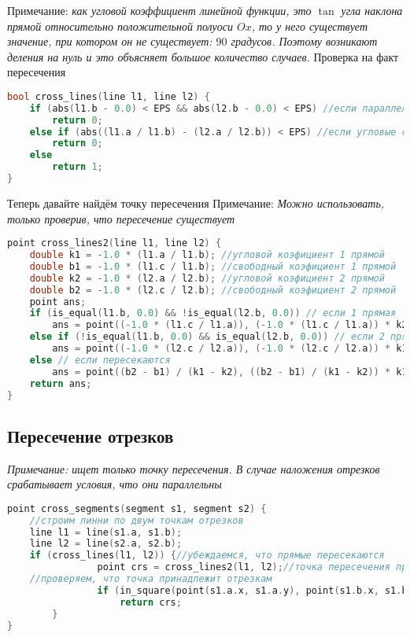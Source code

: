 Примечание: \textit{ как угловой коэффициент линейной функции, это $\tan$ угла наклона прямой относительно положительной полуоси $Ox$, то у него существует значение, при котором он не существует: $90$ градусов. Поэтому возникают деления на нуль и это объясняет большое количество случаев.}
\newline Проверка на факт пересечения
\begin{lstlisting}[language=C++]
bool cross_lines(line l1, line l2) {
    if (abs(l1.b - 0.0) < EPS && abs(l2.b - 0.0) < EPS) //если параллельны oY
        return 0;
    else if (abs((l1.a / l1.b) - (l2.a / l2.b)) < EPS) //если угловые совпали
        return 0;
    else
        return 1;
}
\end{lstlisting}
Теперь давайте найдём точку пересечения\newline
Примечание: \textit{Можно использовать, только проверив, что пересечение существует}\newline
\begin{lstlisting}[language=C++]
point cross_lines2(line l1, line l2) {
    double k1 = -1.0 * (l1.a / l1.b); //угловой коэфициент 1 прямой
    double b1 = -1.0 * (l1.c / l1.b); //свободный коэфициент 1 прямой
    double k2 = -1.0 * (l2.a / l2.b); //угловой коэфициент 2 прямой
    double b2 = -1.0 * (l2.c / l2.b); //свободный коэфициент 2 прямой
    point ans;
    if (is_equal(l1.b, 0.0) && !is_equal(l2.b, 0.0)) // если 1 прямая || Oy
        ans = point((-1.0 * (l1.c / l1.a)), (-1.0 * (l1.c / l1.a)) * k2 + b2);
    else if (!is_equal(l1.b, 0.0) && is_equal(l2.b, 0.0)) // если 2 прямая || Oy
        ans = point((-1.0 * (l2.c / l2.a)), (-1.0 * (l2.c / l2.a)) * k1 + b1);
    else // если пересекаются
        ans = point((b2 - b1) / (k1 - k2), ((b2 - b1) / (k1 - k2)) * k1 + b1);
    return ans;
}
\end{lstlisting}

\subsection{Пересечение отрезков}
\textit{Примечание: ищет только точку пересечения. В случае наложения отрезков срабатывает условия, что они параллельны}
\begin{lstlisting}[language=C++]
point cross_segments(segment s1, segment s2) {
    //строим линни по двум точкам отрезков
	line l1 = line(s1.a, s1.b);
    line l2 = line(s2.a, s2.b);
    if (cross_lines(l1, l2)) {//убеждаемся, что прямые пересекаются
     			point crs = cross_lines2(l1, l2);//точка пересечения прямых
	//проверяем, что точка принадлежит отрезкам
      			if (in_square(point(s1.a.x, s1.a.y), point(s1.b.x, s1.b.y), crs) && 						in_square(point(s2.a.x, s2.a.y), point(s2.b.x, s2.b.y), crs))
          			return crs;
   	 	}
}
\end{lstlisting}

